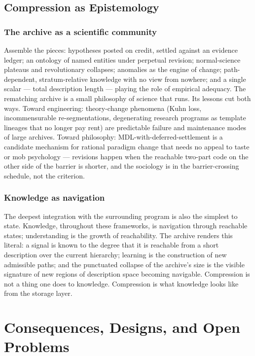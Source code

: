 \documentclass[11pt,oneside]{book}
\theoremstyle{remark}
\begin{document}
\chapter{Compression as Epistemology}

\section{The archive as a scientific community}

Assemble the pieces: hypotheses posted on credit, settled against an
evidence ledger; an ontology of named entities under perpetual revision;
normal-science plateaus and revolutionary collapses; anomalies as the
engine of change; path-dependent, stratum-relative knowledge with no
view from nowhere; and a single scalar --- total description length ---
playing the role of empirical adequacy. The rematching archive is a
small philosophy of science that runs. Its lessons cut both ways.
Toward engineering: theory-change phenomena (Kuhn loss, incommensurable
re-segmentations, degenerating research programs as template lineages
that no longer pay rent) are predictable failure and maintenance modes
of large archives. Toward philosophy: MDL-with-deferred-settlement is a
candidate mechanism for rational paradigm change that needs no appeal
to taste or mob psychology --- revisions happen when the reachable
two-part code on the other side of the barrier is shorter, and the
sociology is in the barrier-crossing schedule, not the criterion.

\section{Knowledge as navigation}

The deepest integration with the surrounding program is also the
simplest to state. Knowledge, throughout these frameworks, is navigation
through reachable states; understanding is the growth of reachability.
The archive renders this literal: a signal is known to the degree that
it is reachable from a short description over the current hierarchy;
learning is the construction of new admissible paths; and the punctuated
collapse of the archive's size is the visible signature of new regions
of description space becoming navigable. Compression is not a thing one
does to knowledge. Compression is what knowledge looks like from the
storage layer.

\part{Consequences, Designs, and Open Problems}
\end{document}
